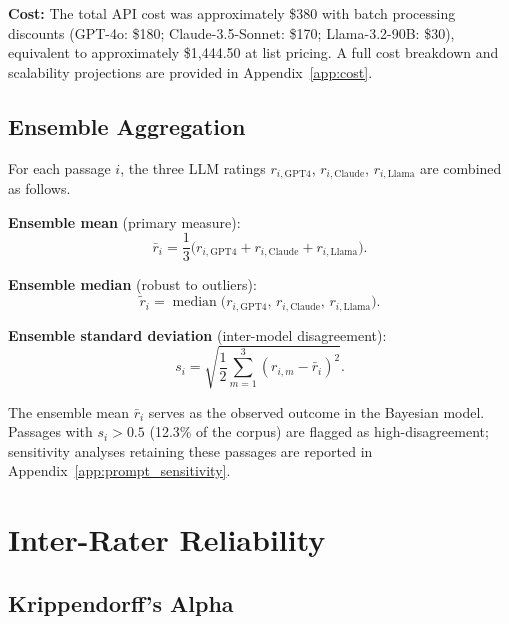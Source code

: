 \documentclass[10pt,letterpaper]{article}
\begin{document}
\textbf{Cost:}  The total API cost was approximately \$380 with batch processing
discounts (GPT-4o: \$180; Claude-3.5-Sonnet: \$170; Llama-3.2-90B: \$30),
equivalent to approximately \$1,444.50 at list pricing.  A full cost breakdown
and scalability projections are provided in Appendix~\ref{app:cost}.

\subsection{Ensemble Aggregation}

For each passage $i$, the three LLM ratings $r_{i,\text{GPT4}}$,
$r_{i,\text{Claude}}$, $r_{i,\text{Llama}}$ are combined as follows.

\textbf{Ensemble mean} (primary measure):
\begin{equation}
  \bar{r}_i = \frac{1}{3}\bigl(r_{i,\text{GPT4}} + r_{i,\text{Claude}} +
    r_{i,\text{Llama}}\bigr).
  \label{eq:ensemble_mean}
\end{equation}

\textbf{Ensemble median} (robust to outliers):
\begin{equation}
  \tilde{r}_i = \operatorname{median}\bigl(r_{i,\text{GPT4}},\,
    r_{i,\text{Claude}},\, r_{i,\text{Llama}}\bigr).
  \label{eq:ensemble_median}
\end{equation}

\textbf{Ensemble standard deviation} (inter-model disagreement):
\begin{equation}
  s_i = \sqrt{\frac{1}{2}\sum_{m=1}^{3}(r_{i,m} - \bar{r}_i)^2}.
  \label{eq:ensemble_std}
\end{equation}

The ensemble mean $\bar{r}_i$ serves as the observed outcome in the Bayesian
model.  Passages with $s_i > 0.5$ (12.3\% of the corpus) are flagged as
high-disagreement; sensitivity analyses retaining these passages are reported
in Appendix~\ref{app:prompt_sensitivity}.

\section{Inter-Rater Reliability}
\label{sec:irr}

\subsection{Krippendorff's Alpha}
\end{document}
